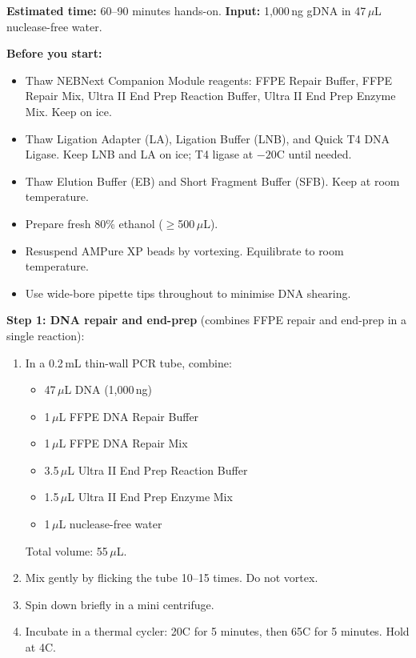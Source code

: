 \begin{protocolbox}[title={Protocol: Nanopore Ligation Sequencing (SQK-LSK114)}]
\textbf{Estimated time:} 60--90 minutes hands-on. \textbf{Input:} 1,000\,ng gDNA in 47\,$\mu$L nuclease-free water.

\textbf{Before you start:}
\begin{itemize}[nosep]
  \item Thaw NEBNext Companion Module reagents: FFPE Repair Buffer, FFPE Repair Mix, Ultra II End Prep Reaction Buffer, Ultra II End Prep Enzyme Mix. Keep on ice.
  \item Thaw Ligation Adapter (LA), Ligation Buffer (LNB), and Quick T4 DNA Ligase. Keep LNB and LA on ice; T4 ligase at $-20$\textdegree C until needed.
  \item Thaw Elution Buffer (EB) and Short Fragment Buffer (SFB). Keep at room temperature.
  \item Prepare fresh 80\% ethanol ($\geq$500\,$\mu$L).
  \item Resuspend AMPure XP beads by vortexing. Equilibrate to room temperature.
  \item Use wide-bore pipette tips throughout to minimise DNA shearing.
\end{itemize}

\textbf{Step 1: DNA repair and end-prep} (combines FFPE repair and end-prep in a single reaction):
\begin{enumerate}[nosep]
  \item In a 0.2\,mL thin-wall PCR tube, combine:
    \begin{itemize}[nosep]
      \item 47\,$\mu$L DNA (1,000\,ng)
      \item 1\,$\mu$L FFPE DNA Repair Buffer
      \item 1\,$\mu$L FFPE DNA Repair Mix
      \item 3.5\,$\mu$L Ultra II End Prep Reaction Buffer
      \item 1.5\,$\mu$L Ultra II End Prep Enzyme Mix
      \item 1\,$\mu$L nuclease-free water
    \end{itemize}
    Total volume: 55\,$\mu$L.
  \item Mix gently by flicking the tube 10--15 times. Do not vortex.
  \item Spin down briefly in a mini centrifuge.
  \item Incubate in a thermal cycler: 20\textdegree C for 5 minutes, then 65\textdegree C for 5 minutes. Hold at 4\textdegree C.
\end{enumerate}


\end{protocolbox}
